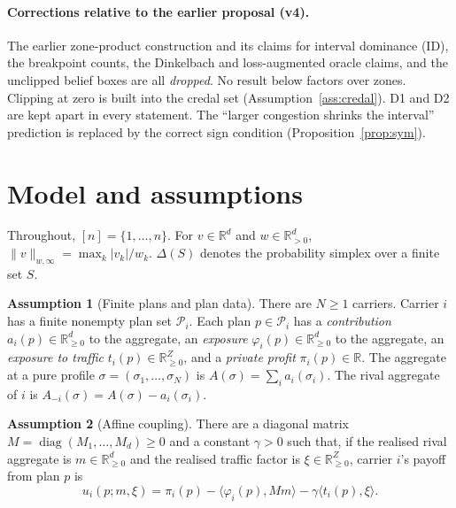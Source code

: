 \documentclass[11pt]{article}
\theoremstyle{definition}
\newtheorem{assumption}{Assumption}
\theoremstyle{remark}
\newcommand{\R}{\mathbb{R}}
\newcommand{\cP}{\mathcal{P}}
\begin{document}
\paragraph{Corrections relative to the earlier proposal (v4).} The earlier zone-product construction and its claims for interval dominance (ID), the breakpoint counts, the Dinkelbach and loss-augmented oracle claims, and the unclipped belief boxes are all \emph{dropped}. No result below factors over zones. Clipping at zero is built into the credal set (Assumption~\ref{ass:credal}). D1 and D2 are kept apart in every statement. The ``larger congestion shrinks the interval'' prediction is replaced by the correct sign condition (Proposition~\ref{prop:sym}).

\section{Model and assumptions}\label{sec:model}

Throughout, $[n]=\{1,\dots,n\}$. For $v\in\R^d$ and $w\in\R^d_{>0}$, $\|v\|_{w,\infty}=\max_k|v_k|/w_k$. $\Delta(S)$ denotes the probability simplex over a finite set $S$.

\begin{assumption}[Finite plans and plan data]\label{ass:plans}
There are $N\ge 1$ carriers. Carrier $i$ has a finite nonempty plan set $\cP_i$. Each plan $p\in\cP_i$ has
a \emph{contribution} $a_i(p)\in\R^d_{\ge0}$ to the aggregate,
an \emph{exposure} $\varphi_i(p)\in\R^d_{\ge0}$ to the aggregate,
an \emph{exposure to traffic} $t_i(p)\in\R^Z_{\ge0}$,
and a \emph{private profit} $\pi_i(p)\in\R$.
The aggregate at a pure profile $\sigma=(\sigma_1,\dots,\sigma_N)$ is $A(\sigma)=\sum_i a_i(\sigma_i)$. The rival aggregate of $i$ is $A_{-i}(\sigma)=A(\sigma)-a_i(\sigma_i)$.
\end{assumption}

\begin{assumption}[Affine coupling]\label{ass:affine}
There are a diagonal matrix $M=\operatorname{diag}(M_1,\dots,M_d)\ge 0$ and a constant $\gamma>0$ such that, if the realised rival aggregate is $m\in\R^d_{\ge0}$ and the realised traffic factor is $\xi\in\R^Z_{\ge0}$, carrier $i$'s payoff from plan $p$ is
\[
 u_i(p;m,\xi)=\pi_i(p)-\langle\varphi_i(p),Mm\rangle-\gamma\langle t_i(p),\xi\rangle .
\]
\end{assumption}
\end{document}

